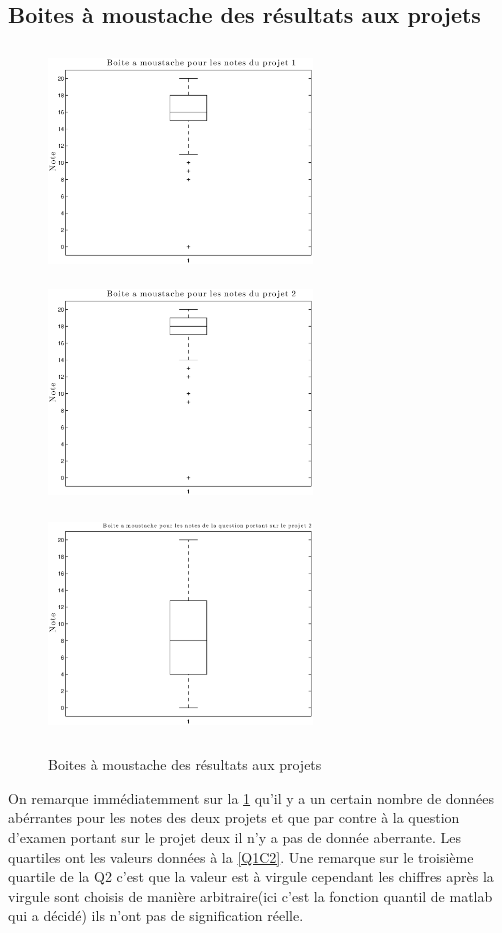 \documentclass[a4paper, 11pt]{article}
\begin{document}
   \subsection{Boites à moustache des résultats aux projets}
   \begin{figure} [H]
	\begin{center}
		\includegraphics[height=6cm, width = 7cm]{Fig/Q1C1.eps}
		\includegraphics[height=6cm, width = 7cm]{Fig/Q1C2.eps}
		\includegraphics[height=6cm, width = 7cm]{Fig/Q1C3.eps}
		\caption{Boites à moustache des résultats aux projets}
		\label{Q1C}
	\end{center}	
	\end{figure}
	On remarque immédiatemment sur la  \ref{Q1C} qu'il y a un certain nombre de données abérrantes pour les notes des deux projets et que par contre à la question d'examen portant sur le projet deux il n'y a pas de donnée aberrante. Les quartiles ont les valeurs données à la  \ref{Q1C2}. Une remarque sur le troisième quartile de la Q2 c'est que la valeur est à virgule cependant les chiffres après la virgule sont choisis de manière arbitraire(ici c'est la fonction quantil de matlab qui a décidé) ils n'ont pas de signification réelle.
\end{document}

